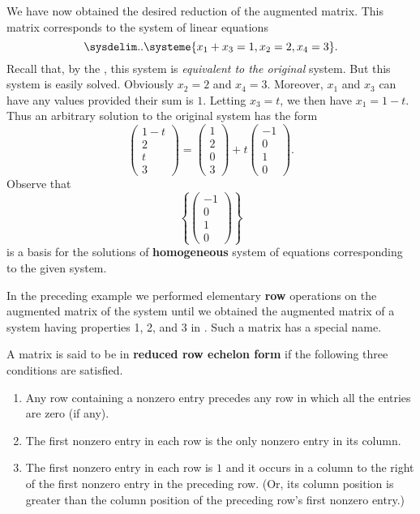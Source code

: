 \begin{remark}
We have now obtained the desired reduction of the augmented matrix.
This matrix corresponds to the system of linear equations
\[
    \sysdelim..\systeme{
        x_1 + x_3 = 1,
        x_2 = 2,
        x_4 = 3
    }.
\]
Recall that, by the , this system is \emph{equivalent to the original} system.
But this system is easily solved.
Obviously \(x_2 = 2\) and \(x_4 = 3\).
Moreover, \(x_1\) and \(x_3\) can have any values provided their sum is \(1\).
Letting \(x_3 = t\), we then have \(x_1 = 1 - t\).
Thus an arbitrary solution to the original system has the form
\[
    \begin{pmatrix} 1 - t \\ 2 \\ t \\ 3 \end{pmatrix}
    = \begin{pmatrix} 1 \\ 2 \\ 0 \\ 3 \end{pmatrix}
    + t \begin{pmatrix} -1 \\ 0 \\ 1 \\ 0 \end{pmatrix}.
\]
Observe that
\[
    \left\{ \begin{pmatrix} -1 \\ 0 \\ 1 \\ 0 \end{pmatrix} \right\}
\]
is a basis for the solutions of \textbf{homogeneous} system of equations corresponding to the given system.
\end{remark}

In the preceding example we performed elementary \textbf{row} operations on the augmented matrix of the system until we obtained the augmented matrix of a system having properties 1, 2, and 3 in .
Such a matrix has a special name.

\begin{definition} \label{def 3.7}
A matrix is said to be in \textbf{reduced row echelon form} if the following three conditions are satisfied.
\begin{enumerate}
\item Any row containing a nonzero entry precedes any row in which all the entries are zero (if any).
\item The first nonzero entry in each row is the only nonzero entry in its column.
\item The first nonzero entry in each row is \(1\) and it occurs in a column to the right of the first nonzero entry in the preceding row.
    (Or, its column position is greater than the column position of the preceding row's first nonzero entry.)
\end{enumerate}
\end{definition}

